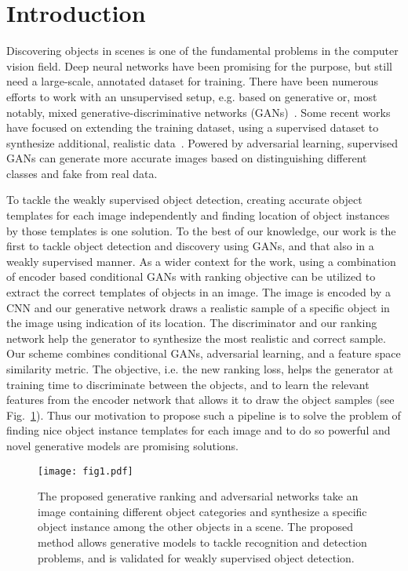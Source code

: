 \documentclass[runningheads]{llncs}
\begin{document}
\section{Introduction} \label{sec:intro}
Discovering objects in scenes is one of the fundamental problems in the computer vision field. Deep neural networks have been promising for the purpose, but still need a large-scale, annotated dataset for training. There have been numerous efforts to work with an unsupervised setup, e.g. based on generative or, most notably, mixed generative-discriminative networks (GANs)~\cite{goodfellow,perarnau,videogan}. Some recent works have focused on extending the training dataset, using a supervised dataset to synthesize additional, realistic data~\cite{dosovitskiy2,nguyen}. Powered by adversarial learning, supervised GANs can generate more accurate images based on distinguishing different classes and fake from real data.

To tackle the weakly supervised object detection, creating accurate object templates for each image independently and finding location of object instances by those templates is one solution. To the best of our knowledge, our work is the first to tackle object detection and discovery using GANs, and that also in a weakly supervised manner. As a wider context for the work, using a combination of encoder based conditional GANs with ranking objective can be utilized to extract the correct templates of objects in an image. The image is encoded by a CNN and our generative network draws a realistic sample of a specific object in the image using indication of its location. The discriminator and our ranking network help the generator to synthesize the most realistic and correct sample. Our scheme combines conditional GANs, adversarial learning, and a feature space similarity metric. The objective, i.e. the new ranking loss, helps the generator at training time to discriminate between the objects, and to learn the relevant features from the encoder network that allows it to draw the object samples (see Fig.~\ref{fig:front}). Thus our motivation to propose such a pipeline is to solve the problem of finding nice object instance templates for each image and to do so powerful and novel generative models are promising solutions. 

\begin{figure}[t]
\centering
{\texttt{[image: fig1.pdf]} 
} \caption{The proposed generative ranking and adversarial networks take an image containing different object categories and synthesize a specific object instance among the other objects in a scene. The proposed method allows generative models to tackle recognition and detection problems, and is validated for weakly supervised object detection.
} 
\label{fig:front}
\end{figure}
\end{document}
